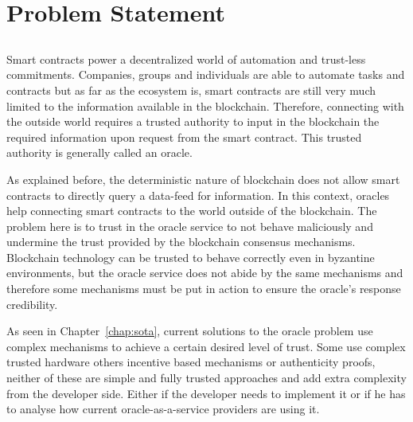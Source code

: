 \chapter{Problem Statement}\label{chap:chap4}

\section*{}


Smart contracts power a decentralized world of automation and trust-less commitments. Companies, groups and individuals are able to automate tasks and contracts but as far as the ecosystem is, smart contracts are still very much limited to the information available in the blockchain. Therefore, connecting with the outside world requires a trusted authority to input in the blockchain the required information upon request from the smart contract. This trusted authority is generally called an oracle.

As explained before, the deterministic nature of blockchain does not allow smart contracts to directly query a data-feed for information. In this context, oracles help connecting smart contracts to the world outside of the blockchain. The problem here is to trust in the oracle service to not behave maliciously and undermine the trust provided by the blockchain consensus mechanisms. Blockchain technology can be trusted to behave correctly even in byzantine environments, but the oracle service does not abide by the same mechanisms and therefore some mechanisms must be put in action to ensure the oracle's response credibility.

As seen in Chapter~\ref{chap:sota}, current solutions to the oracle problem use complex mechanisms to achieve a certain desired level of trust. Some use complex trusted hardware others incentive based mechanisms or authenticity proofs, neither of these are simple and fully trusted approaches and add extra complexity from the developer side. Either if the developer needs to implement it or if he has to analyse how current oracle-as-a-service providers are using it.

